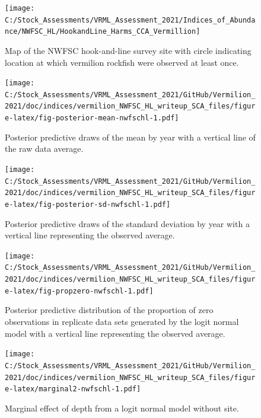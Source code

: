 \documentclass[11pt,
  english,
]{article}
\begin{document}
\FloatBarrier

\begin{figure}
\texttt{[image: C:/Stock\_Assessments/VRML\_Assessment\_2021/Indices\_of\_Abundance/NWFSC\_HL/HookandLine\_Harms\_CCA\_Vermillion]} \caption{Map of the NWFSC hook-and-line survey site with circle indicating location at which vermilion rockfish were observed at least once.}\label{fig:spp-sites}
\end{figure}

\FloatBarrier

\begin{figure}
\centering
\texttt{[image: C:/Stock\_Assessments/VRML\_Assessment\_2021/GitHub/Vermilion\_2021/doc/indices/vermilion\_NWFSC\_HL\_writeup\_SCA\_files/figure-latex/fig-posterior-mean-nwfschl-1.pdf]}
\caption{\label{fig:fig-posterior-mean-nwfschl}Posterior predictive draws of the mean by year with a vertical line of the raw data average.}
\end{figure}

\FloatBarrier

\begin{figure}
\centering
\texttt{[image: C:/Stock\_Assessments/VRML\_Assessment\_2021/GitHub/Vermilion\_2021/doc/indices/vermilion\_NWFSC\_HL\_writeup\_SCA\_files/figure-latex/fig-posterior-sd-nwfschl-1.pdf]}
\caption{\label{fig:fig-posterior-sd-nwfschl}Posterior predictive draws of the standard deviation by year with a vertical line representing the observed average.}
\end{figure}

\begin{figure}
\centering
\texttt{[image: C:/Stock\_Assessments/VRML\_Assessment\_2021/GitHub/Vermilion\_2021/doc/indices/vermilion\_NWFSC\_HL\_writeup\_SCA\_files/figure-latex/fig-propzero-nwfschl-1.pdf]}
\caption{\label{fig:fig-propzero-nwfschl}Posterior predictive distribution of the proportion of zero observations in replicate data sets generated by the logit normal model with a vertical line representing the observed average.}
\end{figure}

\begin{figure}
\centering
\texttt{[image: C:/Stock\_Assessments/VRML\_Assessment\_2021/GitHub/Vermilion\_2021/doc/indices/vermilion\_NWFSC\_HL\_writeup\_SCA\_files/figure-latex/marginal2-nwfschl-1.pdf]}
\caption{\label{fig:marginal2-nwfschl}Marginal effect of depth from a logit normal model without site.}
\end{figure}
\end{document}
